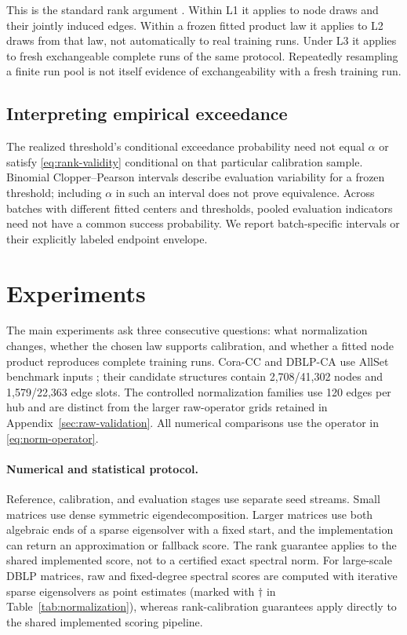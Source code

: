 This is the standard rank argument \cite{vovk2012conditional}.
Within L1 it applies to node draws and their jointly induced edges.
Within a frozen fitted product law it applies to L2 draws from that law,
not automatically to real training runs. Under L3 it applies to fresh
exchangeable complete runs of the same protocol. Repeatedly resampling
a finite run pool is not itself evidence of exchangeability with a
fresh training run.

\subsection{Interpreting empirical exceedance}
The realized threshold's conditional exceedance probability need not
equal $\alpha$ or satisfy \eqref{eq:rank-validity} conditional on that
particular calibration sample. Binomial Clopper--Pearson intervals
describe evaluation variability for a frozen threshold; including
$\alpha$ in such an interval does not prove equivalence. Across batches
with different fitted centers and thresholds, pooled evaluation
indicators need not have a common success probability. We report
batch-specific intervals or their explicitly labeled endpoint envelope.

\section{Experiments}\label{sec:exp}

The main experiments ask three consecutive questions: what
normalization changes, whether the chosen law supports calibration,
and whether a fitted node product reproduces complete training runs.
Cora-CC and DBLP-CA use AllSet benchmark inputs
\cite{chien2022allset}; their candidate structures contain 2,708/41,302
nodes and 1,579/22,363 edge slots. The controlled normalization families
use 120 edges per hub and are distinct from the larger raw-operator
grids retained in Appendix~\ref{sec:raw-validation}. All numerical
comparisons use the operator in \eqref{eq:norm-operator}.

\paragraph{Numerical and statistical protocol.}
Reference, calibration, and evaluation stages use separate seed streams.
Small matrices use dense symmetric eigendecomposition. Larger matrices
use both algebraic ends of a sparse eigensolver with a fixed start,
and the implementation can return an approximation or fallback score.
The rank guarantee applies to the shared implemented score, not to a
certified exact spectral norm. For large-scale DBLP matrices, raw and
fixed-degree spectral scores are computed with iterative sparse
eigensolvers as point estimates (marked with $\dagger$ in
Table~\ref{tab:normalization}), whereas rank-calibration guarantees
apply directly to the shared implemented scoring pipeline.

